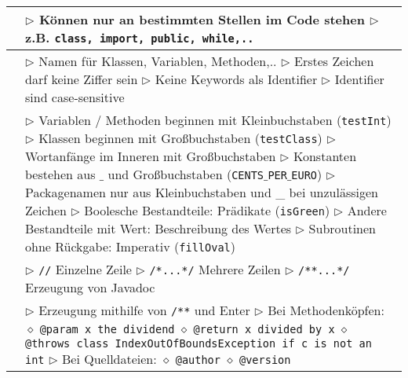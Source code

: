 	\begin{tabular}{ | p{} p{} | }
	\hline

	\makecell[l]{Keywords} & \makecell[l]{
	$\rhd$ Können nur an bestimmten Stellen im Code stehen \\
	$\rhd$ z.B. \texttt{class, import, public, while,..}} \\ \hline
	
	\makecell[l]{Identifier} & \makecell[l]{
	$\rhd$ Namen für Klassen, Variablen, Methoden,.. \\
	$\rhd$ Erstes Zeichen darf keine Ziffer sein \\
	$\rhd$ Keine Keywords als Identifier
	$\rhd$ Identifier sind case-sensitive } \\ \hline
	
	\makecell[l]{Konventionen} & \makecell[l]{
	$\rhd$ Variablen / Methoden beginnen mit Kleinbuchstaben (\texttt{testInt}) \\
	$\rhd$ Klassen beginnen mit Gro\ss buchstaben (\texttt{testClass}) \\
	$\rhd$ Wortanfänge im Inneren mit Gro\ss buchstaben \\
	$\rhd$ Konstanten bestehen aus $\_$ und Gro\ss buchstaben (\texttt{CENTS$\_$PER$\_$EURO}) \\
	$\rhd$ Packagenamen nur aus Kleinbuchstaben und \_ bei unzulässigen Zeichen \\
	$\rhd$ Boolesche Bestandteile: Prädikate (\texttt{isGreen}) \\
	$\rhd$ Andere Bestandteile mit Wert: Beschreibung des Wertes \\
	$\rhd$ Subroutinen ohne Rückgabe: Imperativ (\texttt{fillOval})} \\ \hline
	
	\makecell[l]{Kommentare} & \makecell[l]{
	$\rhd$ \texttt{//} Einzelne Zeile \\
	$\rhd$ \texttt{/*...*/} Mehrere Zeilen \\
	$\rhd$ \texttt{/**...*/} Erzeugung von Javadoc }  \\ \hline

	\makecell[l]{Javadoc} & \makecell[l]{
	$\rhd$ Erzeugung mithilfe von \texttt{/**} und Enter \\
	$\rhd$ Bei Methodenköpfen: \\
	\hspace{0.4cm} $\diamond$ \texttt{@param x the dividend} \\
	\hspace{0.4cm} $\diamond$ \texttt{@return x divided by x}  \\
	\hspace{0.4cm} $\diamond$ \texttt{@throws class IndexOutOfBoundsException if c is not an int} \\
	$\rhd$ Bei Quelldateien: \\
	\hspace{0.4cm} $\diamond$ \texttt{@author} \\
	\hspace{0.4cm} $\diamond$ \texttt{@version}} \\ \hline


\end{tabular}
